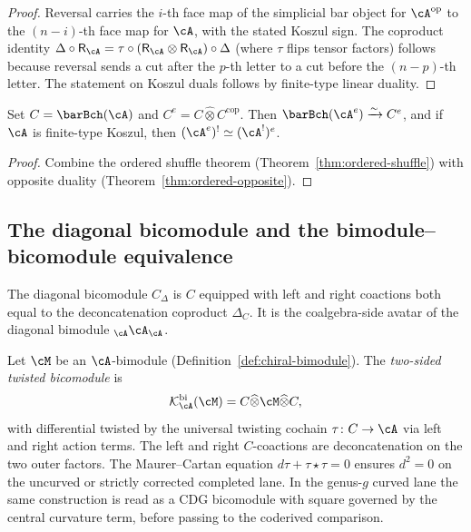 \begin{proof}
Reversal carries the $i$-th face map of the simplicial bar
object for $\cA^{\mathrm{op}}$ to the $(n-i)$-th face map for $\cA$,
with the stated Koszul sign. The coproduct identity
$\Delta \circ \mathsf{R}_\cA =
\tau \circ (\mathsf{R}_\cA \otimes \mathsf{R}_\cA) \circ \Delta$
(where $\tau$ flips tensor factors) follows because reversal sends a
cut after the $p$-th letter to a cut before the $(n-p)$-th letter.
The statement on Koszul duals follows by finite-type linear duality.
\end{proof}

\begin{corollary}
\label{cor:ordered-enveloping}
Set $C = \barBch(\cA)$ and
$C^e = C \widehat\otimes C^{\mathrm{cop}}$. Then
$\barBch(\cA^e) \xrightarrow{\sim} C^e$, and if $\cA$ is
finite-type Koszul, then $(\cA^e)^! \simeq (\cA^!)^e$.
\end{corollary}

\begin{proof}
Combine the ordered shuffle theorem
(Theorem~\ref{thm:ordered-shuffle}) with opposite duality
(Theorem~\ref{thm:ordered-opposite}).
\end{proof}

\subsection{The diagonal bicomodule and the bimodule--bicomodule
equivalence}

The diagonal bicomodule $C_\Delta$ is $C$ equipped with left and
right coactions both equal to the deconcatenation coproduct
$\Delta_C$. It is the coalgebra-side avatar of the diagonal bimodule
${}_\cA \cA_\cA$.

\begin{definition}
\label{def:two-sided-twisted-bicomodule}
Let $\cM$ be an $\cA$-bimodule
(Definition~\ref{def:chiral-bimodule}). The \emph{two-sided twisted
bicomodule} is
\[
 \mathcal{K}_\cA^{\mathrm{bi}}(\cM)
 = C \widehat\otimes \cM \widehat\otimes C,
\]
with differential twisted by the universal twisting cochain
$\tau \colon C \to \cA$ via left and right action terms. The left
and right $C$-coactions are deconcatenation on the two outer factors.
The Maurer--Cartan equation $d\tau + \tau \star \tau = 0$ ensures
$d^2 = 0$ on the uncurved or strictly corrected completed lane.  In
the genus-$g$ curved lane the same construction is read as a CDG
bicomodule with square governed by the central curvature term, before
passing to the coderived comparison.
\end{definition}

